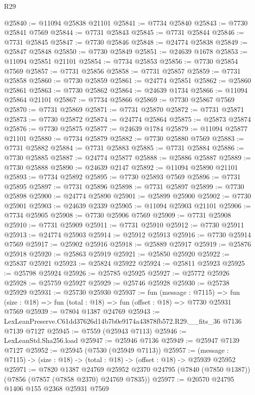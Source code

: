 \begin{lexlean}{R29}
\begin{coremodule}
@25840 := @11094 @25838 @21101
@25841 := @7734 @25840
@25843 := @7730 @25841 @7569
@25844 := @7731 @25843
@25845 := @7731 @25844
@25846 := @7731 @25845
@25847 := @7730 @25846
@25848 := @24774 @25838
@25849 := @25847 @25848
@25850 := @7730 @25849
@25851 := @24639 @1678
@25853 := @11094 @25851 @21101
@25854 := @7734 @25853
@25856 := @7730 @25854 @7569
@25857 := @7731 @25856
@25858 := @7731 @25857
@25859 := @7731 @25858
@25860 := @7730 @25859
@25861 := @24774 @25851
@25862 := @25860 @25861
@25863 := @7730 @25862
@25864 := @24639 @1734
@25866 := @11094 @25864 @21101
@25867 := @7734 @25866
@25869 := @7730 @25867 @7569
@25870 := @7731 @25869
@25871 := @7731 @25870
@25872 := @7731 @25871
@25873 := @7730 @25872
@25874 := @24774 @25864
@25875 := @25873 @25874
@25876 := @7730 @25875
@25877 := @24639 @1784
@25879 := @11094 @25877 @21101
@25880 := @7734 @25879
@25882 := @7730 @25880 @7569
@25883 := @7731 @25882
@25884 := @7731 @25883
@25885 := @7731 @25884
@25886 := @7730 @25885
@25887 := @24774 @25877
@25888 := @25886 @25887
@25889 := @7730 @25888
@25890 := @24639 @2147
@25892 := @11094 @25890 @21101
@25893 := @7734 @25892
@25895 := @7730 @25893 @7569
@25896 := @7731 @25895
@25897 := @7731 @25896
@25898 := @7731 @25897
@25899 := @7730 @25898
@25900 := @24774 @25890
@25901 := @25899 @25900
@25902 := @7730 @25901
@25903 := @24639 @2339
@25905 := @11094 @25903 @21101
@25906 := @7734 @25905
@25908 := @7730 @25906 @7569
@25909 := @7731 @25908
@25910 := @7731 @25909
@25911 := @7731 @25910
@25912 := @7730 @25911
@25913 := @24774 @25903
@25914 := @25912 @25913
@25916 := @7730 @25914 @7569
@25917 := @25902 @25916
@25918 := @25889 @25917
@25919 := @25876 @25918
@25920 := @25863 @25919
@25921 := @25850 @25920
@25922 := @25837 @25921
@25923 := @25824 @25922
@25924 := @25811 @25923
@25925 := @25798 @25924
@25926 := @25785 @25925
@25927 := @25772 @25926
@25928 := @25759 @25927
@25929 := @25746 @25928
@25930 := @25738 @25929
@25931 := @25730 @25930
@25937 := fun (message : @7115) =>
  fun (size : @18) => fun (total : @18) => fun (offset : @18) => @7730 @25931 @7569
@25939 := @7804 @1387 @24769
@25943 := LexLeanPreserve.C61dd37626d14b7b0e9174a43878fb572.R29.__fits_36 @7136 @7139 @7127
@25945 := @7559 (@25943 @7113)
@25946 := LexLeanStd.Sha256.load
@25947 := @25946 @7136
@25949 := @25947 @7139 @7127
@25952 := @25945 (@7530 (@25949 @7113))
@25957 := (message : @7115) -> (size : @18) -> (total : @18) -> (offset : @18) -> @25939 @25952
@25971 := @7820
    @1387
    @24769
    @25952
    @2370
    @24795
    (@7840 (@7850 @1387))
    (@7856 (@7857 (@7858 @2370) @24769 @7835))
@25977 := @20570 @24795 @1406 @155 @2368 @25931 @7569

\end{coremodule}
\end{lexlean}
